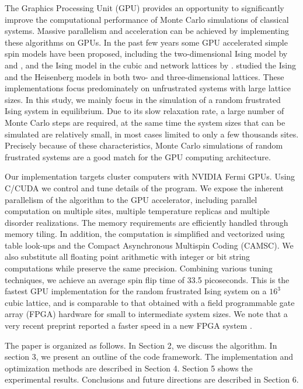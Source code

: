 The Graphics Processing Unit (GPU) provides an opportunity to 
significantly improve the computational performance of Monte Carlo simulations 
of classical systems. Massive parallelism and acceleration can be achieved by 
implementing these algorithms on GPUs. In the past few years some GPU accelerated 
simple spin models have been proposed, including the two-dimensional Ising model 
by \citet{CSTN-093} and \citet{2010CoPhC.181.1549B}, and the Ising model in the cubic 
and network lattices by \citet{Preis:2009:GAM:1537305.1537344}.
\citet{doi:10.1142/S0129183112400025,Weigel:2012:PPS:2151219.2151631}
studied the Ising and the Heisenberg models 
in both two- and three-dimensional lattices. These implementations focus 
predominately on unfrustrated systems with large lattice sizes. In this study, we mainly 
focus in the simulation of a random frustrated Ising system in equilibrium. 
Due to its slow relaxation rate, a large number of Monte Carlo 
steps are required, at the same time the system sizes that can be simulated are 
relatively small, in most cases limited to only a few thousands sites. Precisely 
because of these characteristics, Monte Carlo simulations of random frustrated 
systems are a good match for the GPU computing architecture.

Our implementation targets cluster computers with NVIDIA Fermi GPUs.
Using C/CUDA we control and tune details of the program.
We expose the inherent parallelism of the algorithm
to the GPU accelerator, including parallel computation on multiple sites, multiple temperature 
replicas and multiple disorder realizations. The memory requirements are efficiently handled through
memory tiling. In addition, the computation is simplified and
vectorized using table look-ups and the Compact Asynchronous
Multispin Coding (CAMSC). We also substitute all floating point arithmetic
with integer or bit string computations while preserve the same
precision. Combining various tuning techniques, we achieve an average
spin flip time of 33.5 picoseconds. This is the fastest GPU
implementation for the random frustrated Ising system on a $16^3$
cubic lattice, and is comparable to that obtained with a field
programmable gate array (FPGA) hardware \cite{2012arXiv1204.4134J} for
small to intermediate system sizes. We note that a very recent preprint reported a faster speed in
a new FPGA system \cite{Janus2-2013}. 

The paper is organized as follows. In Section 2, we discuss the algorithm. In section 3, 
we present an outline of the code framework. The implementation 
and optimization methods are described in Section 4. Section 5 shows the experimental  
results. Conclusions and future directions are described in Section 6. 



